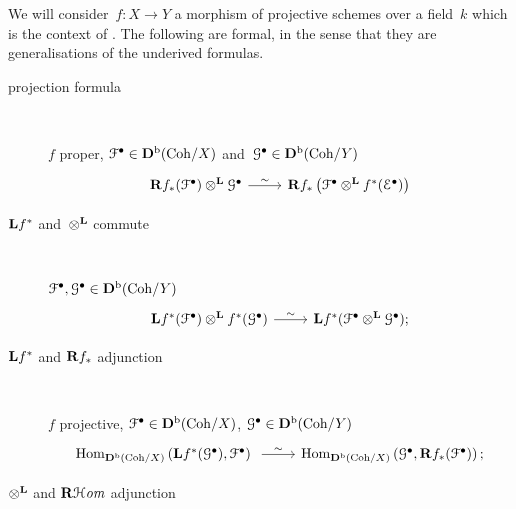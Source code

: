\documentclass[10pt,a4paper]{article}
\begin{document}
We will consider~$f\colon X\to Y$ a morphism of projective schemes over a field~$k$ which is the context of \cite{huybrechts-fourier-mukai-transforms}. The following are formal, in the sense that they are generalisations of the underived formulas.
\begin{description}
  \item[projection formula] {\ }
    
    $f$ proper, $\mathcal{F}^\bullet\in\mathbf{D}^{\mathrm{b}}(\mathrm{Coh}/X)$ and~$\mathcal{G}^\bullet\in\mathbf{D}^{\mathrm{b}}(\mathrm{Coh}/Y)$
    \begin{equation}
      \begin{tikzcd}
        \RRR f_*(\mathcal{F}^\bullet)\otimes^\LLL\mathcal{G}^\bullet \arrow{r}{\sim} & \RRR f_*\left( \mathcal{F}^\bullet\otimes^\LLL f^*(\mathcal{E}^\bullet) \right)
      \end{tikzcd}
    \end{equation}

  \item[$\mathbf{L} f^*$ and~$\otimes^{\mathbf{L}}$ commute] {\ }
    
    $\mathcal{F}^\bullet,\mathcal{G}^\bullet\in\mathbf{D}^{\mathrm{b}}(\mathrm{Coh}/Y)$
    \begin{equation}
      \begin{tikzcd}
        \LLL f^*(\mathcal{F}^\bullet)\otimes^\LLL f^*(\mathcal{G}^\bullet) \arrow{r}{\sim} & \LLL f^*(\mathcal{F}^\bullet\otimes^\LLL\mathcal{G}^\bullet);
      \end{tikzcd}
    \end{equation}

  \item[$\mathbf{L} f^*$ and $\mathbf{R} f_*$ adjunction] {\ }
    
    $f$ projective, $\mathcal{F}^\bullet\in\mathbf{D}^{\mathrm{b}}(\mathrm{Coh}/X)$, $\mathcal{G}^\bullet\in\mathbf{D}^{\mathrm{b}}(\mathrm{Coh}/Y)$
    \begin{equation}
      \begin{tikzcd}
        \Hom_{\derived^\bounded(\Coh/X)}\left( \LLL f^*(\mathcal{G}^\bullet),\mathcal{F}^\bullet \right) \arrow{r}{\sim} & \Hom_{\derived^\bounded(\Coh/X)}\left( \mathcal{G}^\bullet,\RRR f_*(\mathcal{F}^\bullet) \right);
      \end{tikzcd}
    \end{equation}

  \item[$\otimes^{\mathbf{L}}$ and $\operatorname{\mathbf{R}\mathcal{H}\mathit{om}}$ adjunction] {\ }
    

\end{description}
\end{document}

